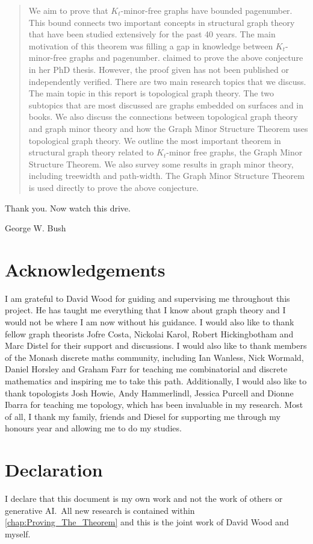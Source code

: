 \begin{abstract}
	We aim to prove that \(K_t\)-minor-free graphs have bounded pagenumber. This bound connects two important concepts in structural graph theory that have been studied extensively for the past 40 years. The main motivation of this theorem was filling a gap in knowledge between $K_t$-minor-free graphs and pagenumber. \textcite{Blankenship-PhD03} claimed to prove the above conjecture in her PhD thesis. However, the proof given has not been published or independently verified. 
	There are two main research topics that we discuss.
	The main topic in this report is topological graph theory. The two subtopics that are most discussed are graphs embedded on surfaces and in books. We also discuss the connections between topological graph theory and graph minor theory and how the Graph Minor Structure Theorem uses topological graph theory. 
	We outline the most important theorem in structural graph theory related to \(K_t\)-minor free graphs, the Graph Minor Structure Theorem. We also survey some results in graph minor theory, including treewidth and path-width. The Graph Minor Structure Theorem is used directly to prove the above conjecture. 
\end{abstract}

\epigraph{Thank you. Now watch this drive.}{George W. Bush}
\newpage

\section{Acknowledgements}
I am grateful to David Wood for guiding and supervising me throughout this project. He has taught me everything that I know about graph theory and I would not be where I am now without his guidance. I would also like to thank fellow graph theorists Jofre Costa, Nickolai Karol, Robert Hickingbotham and Marc Distel for their support and discussions. I would also like to thank members of the Monash discrete maths community, including Ian Wanless, Nick Wormald, Daniel Horsley and Graham Farr for teaching me combinatorial and discrete mathematics and inspiring me to take this path. Additionally, I would also like to thank topologists Josh Howie, Andy Hammerlindl, Jessica Purcell and Dionne Ibarra for teaching me topology, which has been invaluable in my research. Most of all, I thank my family, friends and Diesel for supporting me through my honours year and allowing me to do my studies.

\section{Declaration}

I declare that this document is my own work and not the work of others or generative AI.\ All new research is contained within \cref{chap:Proving_The_Theorem} and this is the joint work of David Wood and myself.

